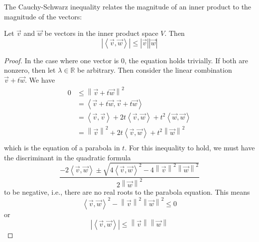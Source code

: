 The Cauchy-Schwarz inequality relates the magnitude of an inner product to the magnitude of the vectors:
\begin{theorem}
Let $\vec{v}$ and $\vec{w}$ be vectors in the inner product space $V$. Then \[ \left| \left\langle \vec{v}, \vec{w} \right\rangle \right| \leq \left| \vec{v}\right| \left| \vec{w} \right| \]
\end{theorem}
\begin{proof}
In the case where one vector is $0$, the equation holds trivially. If both are nonzero, then let $\lambda \in \mathbb{R}$ be arbitrary. Then consider the linear combination $\vec{v}+t\vec{w}$. We have
\begin{align*}
	0 & \leq \left\lVert \vec{v}+t\vec{w} \right\rVert^2 \\
	& = \left\langle \vec{v}+t\vec{w},\vec{v}+t\vec{w} \right\rangle \\
	& = \left\langle \vec{v}, \vec{v} \right\rangle + 2t \left\langle \vec{v},\vec{w} \right\rangle + t^2\left\langle \vec{w},\vec{w}\right\rangle \\
	& = \left\lVert \vec{v} \right\rVert^2  + 2t \left\langle \vec{v},\vec{w} \right\rangle + t^2 \left\lVert \vec{w} \right\rVert^2 \\
\end{align*}
which is the equation of a parabola in $t$. For this inequality to hold, we must have the discriminant in the quadratic formula
\[ \frac{-2\left\langle \vec{v}, \vec{w} \right\rangle \pm \sqrt{ 4\left\langle \vec{v},\vec{w}\right\rangle^2 - 4\left\lVert \vec{v}\right\rVert^2 \left\lVert \vec{w} \right\rVert^2               }}{2\left\lVert \vec{w} \right\rVert^2 } \] to be negative, i.e., there are no real roots to the parabola equation. This means \[ \left\langle \vec{v}, \vec{w} \right\rangle^2 - \left\lVert \vec{v} \right\rVert^2 \left\lVert \vec{w} \right\rVert^2 \leq 0 \] or \[ \left| \left\langle \vec{v}, \vec{w} \right\rangle \right| \leq \left\lVert \vec{v} \right\rVert \left\lVert \vec{w} \right\rVert  \]
\end{proof}


